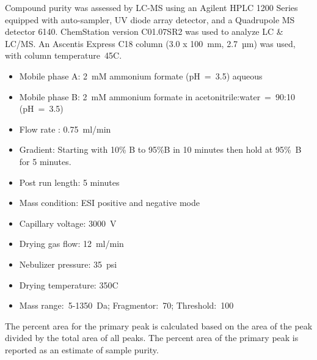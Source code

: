 \documentclass[9pt,lineno]{elife}
\begin{document}
Compound purity was assessed by LC-MS using an Agilent HPLC 1200 Series equipped with auto-sampler, UV diode array detector, and a Quadrupole MS detector 6140. 
ChemStation version C01.07SR2 was used to analyze LC \& LC/MS.
An Ascentis Express C18 column (3.0 x 100~mm, 2.7~µm) was used, with column temperature~45\textdegree C.
\begin{itemize}
\item Mobile phase A: 2~mM ammonium formate (pH~=~3.5) aqueous
\item Mobile phase B: 2~mM ammonium formate in acetonitrile:water~=~90:10 (pH~=~3.5)
\item Flow rate : 0.75~ml/min
\item Gradient: Starting with 10\% B to 95\%B in 10 minutes then hold at 95\%~B for 5 minutes. 
\item Post run length: 5 minutes 
\item Mass condition: ESI positive and negative mode
\item Capillary voltage: 3000~V
\item Drying gas flow: 12~ml/min
\item Nebulizer pressure: 35~psi
\item Drying temperature: 350\textdegree C
\item Mass range:~5-1350~Da; Fragmentor:~70; Threshold:~100
\end{itemize}
The percent area for the primary peak is calculated based on the area of the peak divided by the total area of all peaks. 
The percent area of the primary peak is reported as an estimate of sample purity.
\end{document}
